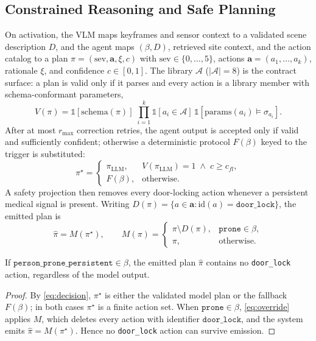\subsection{\textbf{Constrained Reasoning and Safe Planning}}
\label{sec:plan}
On activation, the VLM maps keyframes and sensor context to a validated scene
description $D$, and the agent maps $(\beta,D)$, retrieved site context, and the
action catalog to a plan $\pi=(\text{sev},\mathbf{a},\xi,c)$ with
$\text{sev}\in\{0,\dots,5\}$, actions $\mathbf{a}=(a_1,\dots,a_k)$, rationale
$\xi$, and confidence $c\in[0,1]$. The library $\mathcal{A}$ ($|\mathcal{A}|=8$)
is the contract surface: a plan is valid only if it parses and every action is a
library member with schema-conformant parameters,
\begin{equation}
V(\pi) = \mathbb{1}[\text{schema}(\pi)]\;
\prod_{i=1}^{k}\mathbb{1}[a_i\in\mathcal{A}]\,
\mathbb{1}[\text{params}(a_i)\models \sigma_{a_i}].
\label{eq:valid}
\end{equation}
After at most $r_{\max}$ correction retries, the agent output is accepted only if
valid and sufficiently confident; otherwise a deterministic protocol
$F(\beta)$ keyed to the trigger is substituted:
\begin{equation}
\pi^{\star} =
\begin{cases}
\pi_{\text{LLM}}, & V(\pi_{\text{LLM}})=1 \;\wedge\; c \ge c_{fl},\\[2pt]
F(\beta), & \text{otherwise.}
\end{cases}
\label{eq:decision}
\end{equation}
A safety projection then removes every door-locking action whenever a persistent
medical signal is present. Writing $D(\pi)=\{a\in\mathbf{a}:\text{id}(a)=\texttt{door\_lock}\}$,
the emitted plan is
\begin{equation}
\hat\pi = M(\pi^{\star}),\qquad
M(\pi)=\begin{cases}
\pi \setminus D(\pi), & \texttt{prone}\in\beta,\\
\pi, & \text{otherwise.}
\end{cases}
\label{eq:override}
\end{equation}

\begin{proposition}
\label{prop:safety}
If $\texttt{person\_prone\_persistent}\in\beta$, the emitted plan $\hat\pi$
contains no \texttt{door\_lock} action, regardless of the model output.
\end{proposition}
\begin{proof}
By \eqref{eq:decision}, $\pi^{\star}$ is either the validated model plan or the
fallback $F(\beta)$; in both cases $\pi^\star$ is a finite action set. When
$\texttt{prone}\in\beta$, \eqref{eq:override} applies $M$, which deletes every
action with identifier $\texttt{door\_lock}$, and the system emits
$\hat\pi=M(\pi^\star)$. Hence no \texttt{door\_lock} action can survive emission.
\end{proof}

